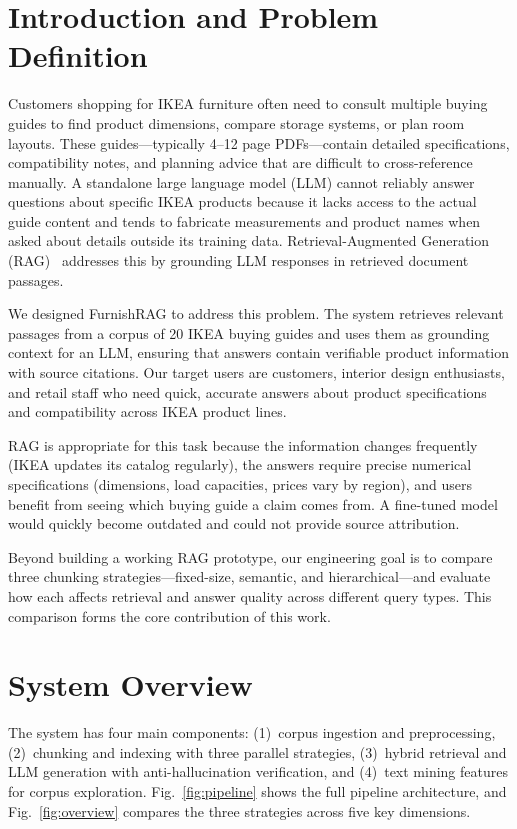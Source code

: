 \documentclass[conference]{IEEEtran}
\begin{document}
\section{Introduction and Problem Definition}

Customers shopping for IKEA furniture often need to consult multiple buying guides to find product dimensions, compare storage systems, or plan room layouts. These guides---typically 4--12 page PDFs---contain detailed specifications, compatibility notes, and planning advice that are difficult to cross-reference manually. A standalone large language model (LLM) cannot reliably answer questions about specific IKEA products because it lacks access to the actual guide content and tends to fabricate measurements and product names when asked about details outside its training data. Retrieval-Augmented Generation (RAG)~\cite{b1} addresses this by grounding LLM responses in retrieved document passages.

We designed FurnishRAG to address this problem. The system retrieves relevant passages from a corpus of 20 IKEA buying guides and uses them as grounding context for an LLM, ensuring that answers contain verifiable product information with source citations. Our target users are customers, interior design enthusiasts, and retail staff who need quick, accurate answers about product specifications and compatibility across IKEA product lines.

RAG is appropriate for this task because the information changes frequently (IKEA updates its catalog regularly), the answers require precise numerical specifications (dimensions, load capacities, prices vary by region), and users benefit from seeing which buying guide a claim comes from. A fine-tuned model would quickly become outdated and could not provide source attribution.

Beyond building a working RAG prototype, our engineering goal is to compare three chunking strategies---fixed-size, semantic, and hierarchical---and evaluate how each affects retrieval and answer quality across different query types. This comparison forms the core contribution of this work.

\section{System Overview}

The system has four main components: (1)~corpus ingestion and preprocessing, (2)~chunking and indexing with three parallel strategies, (3)~hybrid retrieval and LLM generation with anti-hallucination verification, and (4)~text mining features for corpus exploration. Fig.~\ref{fig:pipeline} shows the full pipeline architecture, and Fig.~\ref{fig:overview} compares the three strategies across five key dimensions.
\end{document}
